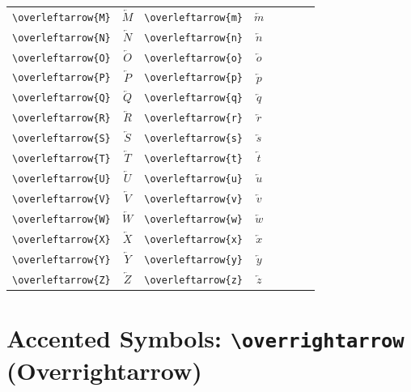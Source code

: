 \documentclass[12pt,a4paper]{article}
\begin{document}
\begin{longtable}{|l|c|l|c|c|l|c|c|}
\verb|\overleftarrow{M}| & $\overleftarrow{M}$ & \verb|\overleftarrow{m}| & $\overleftarrow{m}$ & & & & \\
\verb|\overleftarrow{N}| & $\overleftarrow{N}$ & \verb|\overleftarrow{n}| & $\overleftarrow{n}$ & & & & \\
\verb|\overleftarrow{O}| & $\overleftarrow{O}$ & \verb|\overleftarrow{o}| & $\overleftarrow{o}$ & & & & \\
\verb|\overleftarrow{P}| & $\overleftarrow{P}$ & \verb|\overleftarrow{p}| & $\overleftarrow{p}$ & & & & \\
\verb|\overleftarrow{Q}| & $\overleftarrow{Q}$ & \verb|\overleftarrow{q}| & $\overleftarrow{q}$ & & & & \\
\verb|\overleftarrow{R}| & $\overleftarrow{R}$ & \verb|\overleftarrow{r}| & $\overleftarrow{r}$ & & & & \\
\verb|\overleftarrow{S}| & $\overleftarrow{S}$ & \verb|\overleftarrow{s}| & $\overleftarrow{s}$ & & & & \\
\verb|\overleftarrow{T}| & $\overleftarrow{T}$ & \verb|\overleftarrow{t}| & $\overleftarrow{t}$ & & & & \\
\verb|\overleftarrow{U}| & $\overleftarrow{U}$ & \verb|\overleftarrow{u}| & $\overleftarrow{u}$ & & & & \\
\verb|\overleftarrow{V}| & $\overleftarrow{V}$ & \verb|\overleftarrow{v}| & $\overleftarrow{v}$ & & & & \\
\verb|\overleftarrow{W}| & $\overleftarrow{W}$ & \verb|\overleftarrow{w}| & $\overleftarrow{w}$ & & & & \\
\verb|\overleftarrow{X}| & $\overleftarrow{X}$ & \verb|\overleftarrow{x}| & $\overleftarrow{x}$ & & & & \\
\verb|\overleftarrow{Y}| & $\overleftarrow{Y}$ & \verb|\overleftarrow{y}| & $\overleftarrow{y}$ & & & & \\
\verb|\overleftarrow{Z}| & $\overleftarrow{Z}$ & \verb|\overleftarrow{z}| & $\overleftarrow{z}$ & & & & \\
\hline
\end{longtable}

\newpage

\section*{Accented Symbols: \texttt{\textbackslash overrightarrow} (Overrightarrow)}
\end{document}
